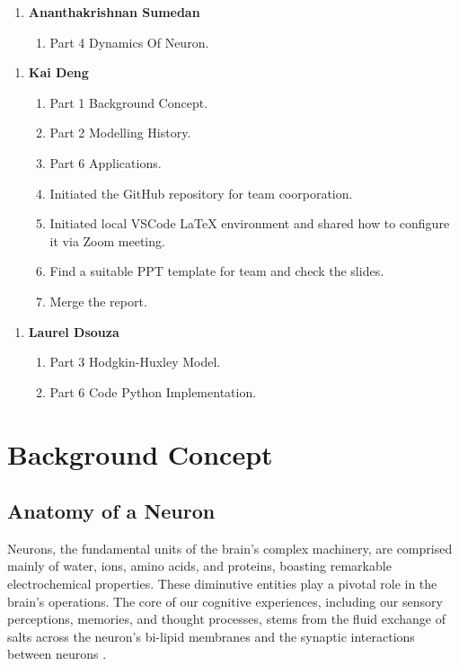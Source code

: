 \documentclass[12pt,a4paper]{report}
\begin{document}
\begin{enumerate}
    \item[] \textbf{Ananthakrishnan Sumedan}
    \begin{enumerate}
        \item Part 4 Dynamics Of Neuron.   
    \end{enumerate}
\end{enumerate}


\begin{enumerate}
    \item[] \textbf{Kai Deng}
    \begin{enumerate}
        \item Part 1 Background Concept. 
        \item Part 2 Modelling History.
        \item Part 6 Applications.
        \item Initiated the GitHub repository for team coorporation.
        \item Initiated local VSCode LaTeX environment and shared how to configure it via Zoom meeting.
        \item Find a suitable PPT template for team and check the slides.
        \item Merge the report.
    \end{enumerate}
\end{enumerate}

\begin{enumerate}
    \item[] \textbf{Laurel Dsouza}
    \begin{enumerate}
        \item Part 3 Hodgkin-Huxley Model.
        \item Part 6 Code Python Implementation.
    \end{enumerate}
\end{enumerate}




\clearpage

\chapter{Background Concept}
\section{Anatomy of a Neuron}
Neurons, the fundamental units of the brain's complex machinery, are comprised mainly of water, ions, amino acids, and proteins, boasting remarkable electrochemical properties. These diminutive entities play a pivotal role in the brain's operations. The core of our cognitive experiences, including our sensory perceptions, memories, and thought processes, stems from the fluid exchange of salts across the neuron's bi-lipid membranes and the synaptic interactions between neurons \cite{EpithelialSodiumTransport}.
\end{document}
